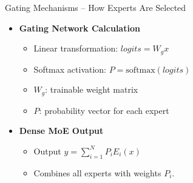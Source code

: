 \begin{frame}[allowframebreaks]{Gating Mechanisms – How Experts Are Selected}
\begin{itemize}
\begin{itemize}
            \item \textbf{Gating Network Calculation}
            \begin{itemize}
                \item Linear transformation: $logits = W_g x$
                \item Softmax activation: $P = \text{softmax}(logits)$
                \item $W_g$: trainable weight matrix
                \item $P$: probability vector for each expert
            \end{itemize}
        \framebreak
            \item \textbf{Dense MoE Output}
            \begin{itemize}
                \item Output $y = \sum_{i=1}^N P_i E_i(x)$
                \item Combines all experts with weights $P_i$.
            \end{itemize}


\end{itemize}
\end{itemize}
\end{frame}
